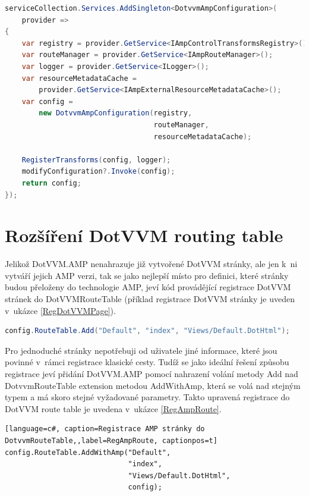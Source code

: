 \begin{lstlisting}[language=c#, caption=Registrace DotvvmAmpConfiguration,label=RegAmpConfig,captionpos=t]
serviceCollection.Services.AddSingleton<DotvvmAmpConfiguration>(
    provider =>
{
    var registry = provider.GetService<IAmpControlTransformsRegistry>();
    var routeManager = provider.GetService<IAmpRouteManager>();
    var logger = provider.GetService<ILogger>();
    var resourceMetadataCache =
        provider.GetService<IAmpExternalResourceMetadataCache>();
    var config =
        new DotvvmAmpConfiguration(registry,
                                   routeManager,
                                   resourceMetadataCache);
        
    RegisterTransforms(config, logger);
    modifyConfiguration?.Invoke(config);
    return config;
});
\end{lstlisting}
\section{Rozšíření DotVVM routing table}
Jelikož DotVVM.AMP nenahrazuje již vytvořené DotVVM stránky, ale jen k~ni vytváří jejich AMP verzi, tak se jako nejlepší místo pro definici, které stránky budou přeloženy do technologie AMP, jeví kód provádějící registrace DotVVM stránek do DotVVMRouteTable (příklad registrace DotVVM stránky je uveden v~ukázce \ref{RegDotVVMPage}).

\begin{lstlisting}[language=c#, caption=Registrace DotVVM stránky do DotvvmRouteTable,label=RegDotVVMPage,captionpos=t]
config.RouteTable.Add("Default", "index", "Views/Default.DotHtml");
\end{lstlisting}

\pagebreak
Pro jednoduché stránky nepotřebuji od uživatele jiné informace, které jsou povinné v~rámci registrace klasické cesty.
Tudíž se jako ideální řešení způsobu registrace jeví přidání DotVVM.AMP pomocí nahrazení volání metody Add nad DotvvmRouteTable extension metodou AddWithAmp, která se volá nad stejným typem a má skoro stejné vyžadované parametry. Takto upravená registrace do DotVVM route table je uvedena v~ukázce \ref{RegAmpRoute}.

\begin{lstlisting}[language=c#, caption=Registrace AMP stránky do DotvvmRouteTable,,label=RegAmpRoute, captionpos=t]
config.RouteTable.AddWithAmp("Default",
                             "index",
                             "Views/Default.DotHtml",
                             config);
\end{lstlisting}

